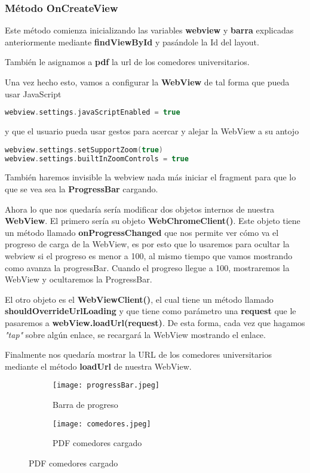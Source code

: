 \subsubsection{Método OnCreateView}

Este método comienza inicializando las variables \textbf{webview} y \textbf{barra} explicadas anteriormente mediante \textbf{findViewById} y pasándole la Id del layout.

También le asignamos a \textbf{pdf} la url de los comedores universitarios.

Una vez hecho esto, vamos a configurar la \textbf{WebView} de tal forma que pueda usar JavaScript

\begin{lstlisting}[language=Kotlin]
webview.settings.javaScriptEnabled = true
\end{lstlisting}

y que el usuario pueda usar gestos para acercar y alejar la WebView a su antojo

\begin{lstlisting}[language=Kotlin]
webview.settings.setSupportZoom(true)
webview.settings.builtInZoomControls = true
\end{lstlisting}

También haremos invisible la webview nada más iniciar el fragment para que lo que se vea sea la \textbf{ProgressBar} cargando.

Ahora lo que nos quedaría sería modificar dos objetos internos de nuestra \textbf{WebView}. El primero sería su objeto \textbf{WebChromeClient()}. Este objeto tiene un método llamado \textbf{onProgressChanged} que nos permite ver cómo va el progreso de carga de la WebView, es por esto que lo usaremos para ocultar la webview si el progreso es menor a 100, al mismo tiempo que vamos mostrando como avanza la progressBar. Cuando el progreso llegue a 100, mostraremos la WebView y ocultaremos la ProgressBar.

El otro objeto es el \textbf{WebViewClient()}, el cual tiene un método llamado \textbf{shouldOverrideUrlLoading} y que tiene como parámetro una \textbf{request} que le pasaremos a \textbf{webView.loadUrl(request)}. De esta forma, cada vez que hagamos \textit{"tap"} sobre algún enlace, se recargará la WebView mostrando el enlace.

Finalmente nos quedaría mostrar la URL de los comedores universitarios mediante el método \textbf{loadUrl} de nuestra WebView.

\begin{figure}[H]

  \begin{subfigure}{0.5\textwidth}
    \centering
    \texttt{[image: progressBar.jpeg]}
    \caption{Barra de progreso}
    \label{fig:sub-first}
  \end{subfigure}
  \begin{subfigure}{0.5\textwidth}
    \centering
    \texttt{[image: comedores.jpeg]}
    \caption{PDF comedores cargado}
    \label{fig:sub-second}
  \end{subfigure}
\end{figure}

